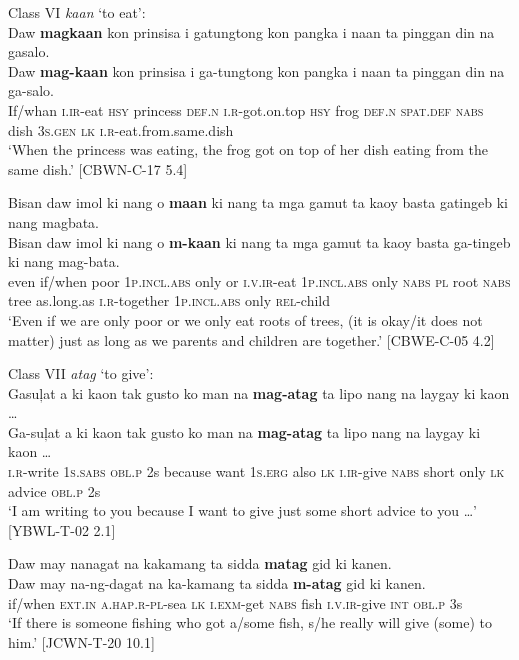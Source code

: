 \ea
Class VI \textit{kaan} ‘to eat’: \\
Daw  \textbf{magkaan}  kon  prinsisa  i  gatungtong  kon  pangka  i naan  ta  pinggan  din  na  gasalo. \\\smallskip
\gll Daw  \textbf{mag-kaan}  kon  prinsisa  i  ga-tungtong  kon  pangka  i naan  ta  pinggan  din  na  ga-salo. \\
If/whan  \textsc{i.ir}-eat  \textsc{hsy}  princess  \textsc{def.n}  \textsc{i.r}-got.on.top  \textsc{hsy}  frog  \textsc{def.n}
\textsc{spat.def}  \textsc{nabs}   dish  3\textsc{s.gen}  \textsc{lk}  \textsc{i.r}-eat.from.same.dish \\
\glt ‘When the princess was eating, the frog got on top of her dish eating from the same dish.’ [CBWN-C-17 5.4]
\z

\ea
Bisan  daw  imol  ki  nang  o  \textbf{maan}  ki  nang  ta  mga gamut  ta  kaoy  basta  gatingeb  ki  nang  magbata.\\\smallskip
\gll Bisan  daw  imol  ki  nang  o  \textbf{m-kaan}  ki  nang  ta  mga gamut  ta  kaoy  basta  ga-tingeb  ki  nang  mag-bata.\\
  even  if/when  poor  1\textsc{p.incl.abs}  only  or  \textsc{i.v.ir}-eat  1\textsc{p.incl.abs}  only  \textsc{nabs}  \textsc{pl}
root  \textsc{nabs}  tree  as.long.as  \textsc{i.r}-together  1\textsc{p.incl.abs}  only  \textsc{rel}-child \\
\glt ‘Even if we are only poor or we only eat roots of trees, (it is okay/it does not matter) just as long as we parents and children are together.’ [CBWE-C-05 4.2] 
\z

\largerpage
\ea
Class VII \textit{atag} ‘to give’: \\
Gasuļat  a  ki  kaon  tak  gusto  ko  man  na  \textbf{mag-atag} ta  lipo  nang  na  laygay  ki  kaon … \\\smallskip
\gll Ga-suļat  a  ki  kaon  tak  gusto  ko  man  na  \textbf{mag-atag} ta  lipo  nang  na  laygay  ki  kaon … \\
\textsc{i.r}-write  1\textsc{s.sabs}  \textsc{obl.p}  2s  because  want  1\textsc{s.erg}  also  \textsc{lk}  \textsc{i.ir}-give
\textsc{nabs}  short  only  \textsc{lk}  advice  \textsc{obl.p}  2s \\
\glt ‘I am writing to you because I want to give just some short advice to you …’ [YBWL-T-02 2.1]
\z

\ea
Daw  may  nanagat  na  kakamang  ta  sidda  \textbf{matag} gid  ki  kanen. \\\smallskip
\gll Daw  may  na-ng-dagat  na  ka-kamang  ta  sidda  \textbf{m-atag} gid  ki  kanen. \\
 if/when  \textsc{ext.in}  \textsc{a.hap.r}-\textsc{pl}-sea  \textsc{lk}  \textsc{i.exm}-get  \textsc{nabs}  fish  \textsc{i.v.ir}-give \textsc{int}  \textsc{obl.p}  3s \\
\glt ‘If there is someone fishing who got a/some fish, s/he really will give (some) to him.’ [JCWN-T-20 10.1]
\z


